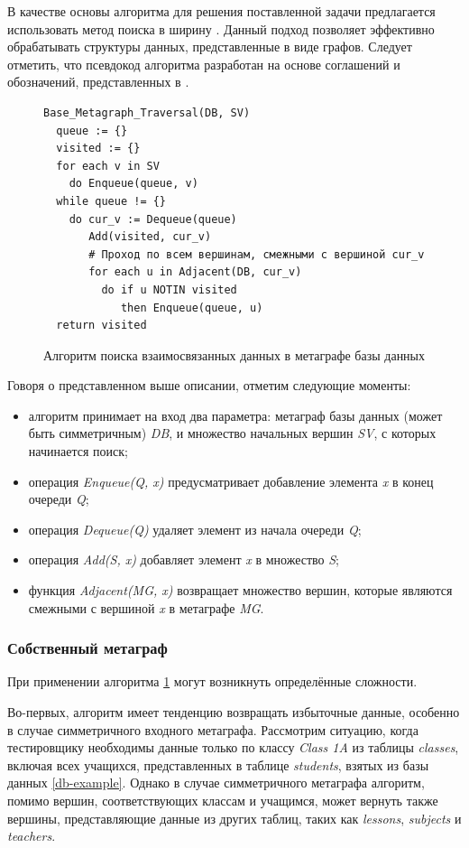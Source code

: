 В качестве основы алгоритма для решения поставленной задачи предлагается использовать метод поиска в ширину \cite{bfs}. Данный подход позволяет эффективно обрабатывать структуры данных, представленные в виде графов. Следует отметить, что псевдокод алгоритма разработан на основе соглашений и обозначений, представленных в \cite{kormen-algorithms}.

\begin{figure}
  \begin{lstlisting}
Base_Metagraph_Traversal(DB, SV)
  queue := {}
  visited := {}
  for each v in SV
    do Enqueue(queue, v)
  while queue != {}
    do cur_v := Dequeue(queue)
       Add(visited, cur_v)
       # Проход по всем вершинам, смежными с вершиной cur_v
       for each u in Adjacent(DB, cur_v)
         do if u NOTIN visited
            then Enqueue(queue, u)
  return visited
  \end{lstlisting}
  \caption{Алгоритм поиска взаимосвязанных данных в метаграфе базы данных}
  \label{base-algorithm}
\end{figure}

Говоря о представленном выше описании, отметим следующие моменты:
\begin{itemize}
  \item алгоритм принимает на вход два параметра: метаграф базы данных (может быть симметричным) \textit{DB}, и множество начальных вершин \textit{SV}, с которых начинается поиск;
  \item операция \textit{Enqueue(Q, x)} предусматривает добавление элемента \textit{x} в конец очереди \textit{Q};
  \item операция \textit{Dequeue(Q)} удаляет элемент из начала очереди \textit{Q};
  \item операция \textit{Add(S, x)} добавляет элемент \textit{x} в множество \textit{S};
  \item функция \textit{Adjacent(MG, x)} возвращает множество вершин, которые являются смежными с вершиной \textit{x} в метаграфе \textit{MG}.
\end{itemize}

\subsubsection{Собственный метаграф}

При применении алгоритма \ref{base-algorithm} могут возникнуть определённые сложности.

Во-первых, алгоритм имеет тенденцию возвращать избыточные данные, особенно в случае симметричного входного метаграфа. Рассмотрим ситуацию, когда тестировщику необходимы данные только по классу \textit{Class 1A} из таблицы \textit{classes}, включая всех учащихся, представленных в таблице \textit{students}, взятых из базы данных \ref{db-example}. Однако в случае симметричного метаграфа алгоритм, помимо вершин, соответствующих классам и учащимся, может вернуть также вершины, представляющие данные из других таблиц, таких как \textit{lessons}, \textit{subjects} и \textit{teachers}.

